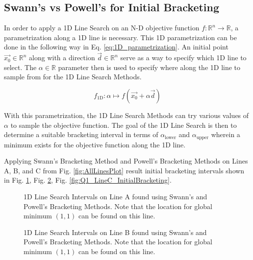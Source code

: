 \documentclass{article}
\begin{document}
    \subsection{Swann's vs Powell's for Initial Bracketing}

    In order to apply a 1D Line Search on an N-D objective function $f: \mathbb{R}^n \rightarrow \mathbb{R}$, a parametrization along a 1D line is necessary.
    This 1D parametrization can be done in the following way in Eq. \ref{eq:1D_parametrization}. 
    An initial point $\vec{x_0} \in \mathbb{R}^n$ along with a direction $\vec{d} \in \mathbb{R}^n$ serve as a way to specify which 1D line to select.
    The $\alpha \in \mathbb{R}$ parameter then is used to specify where along the 1D line to sample from for the 1D Line Search Methods.

    \begin{equation} \label{eq:1D_parametrization}
        f_{\text{1D}} : \alpha \mapsto f \left( \vec{x_0} + \alpha\vec{d} \right)
    \end{equation}

    With this parametrization, the 1D Line Search Methods can try various values of $\alpha$ to sample the objective function.
    The goal of the 1D Line Search is then to determine a suitable bracketing interval in terms of $\alpha_\text{lower}$ and $\alpha_\text{upper}$ wherein a minimum exists for the objective function along the 1D line.
    
    Applying Swann's Bracketing Method and Powell's Bracketing Methods on Lines A, B, and C from Fig. \ref{fig:AllLinesPlot} result initial bracketing intervals shown in Fig. \ref{fig:Q1_LineA_InitialBracketing}, Fig. \ref{fig:Q1_LineB_InitialBracketing}, Fig. \ref{fig:Q1_LineC_InitialBracketing}.

    \begin{figure}[H]
        \centering
        
        \caption{1D Line Search Intervals on Line A found using Swann's and Powell's Bracketing Methods. Note that the location for global minimum $(1, 1)$ can be found on this line.}
        \label{fig:Q1_LineA_InitialBracketing}
    \end{figure}

    \begin{figure}[H]
        \centering
        
        \caption{1D Line Search Intervals on Line B found using Swann's and Powell's Bracketing Methods. Note that the location for global minimum $(1, 1)$ can be found on this line.}
        \label{fig:Q1_LineB_InitialBracketing}
    \end{figure}
\end{document}
